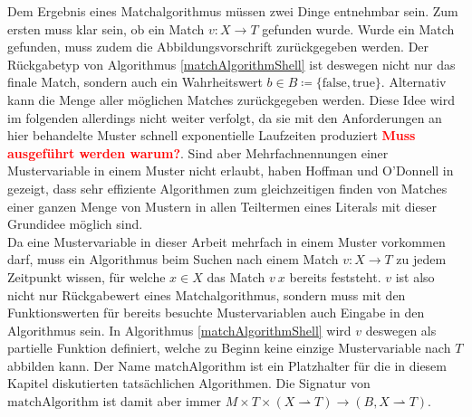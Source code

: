 \documentclass{scrartcl}
\numberwithin{figure}{section} %
\theoremstyle{definition} %
\newcommand{\BFred}[1]{\textbf{\textcolor{red}{#1}}}
\begin{document}
Dem Ergebnis eines Matchalgorithmus müssen zwei Dinge entnehmbar sein. Zum ersten muss klar sein, ob ein Match $v \colon X \rightarrow T$ gefunden wurde. Wurde ein Match gefunden, muss zudem die Abbildungsvorschrift zurückgegeben werden. Der Rückgabetyp von Algorithmus \ref{matchAlgorithmShell} ist deswegen nicht nur das finale Match, sondern auch ein Wahrheitswert $b \in B \coloneqq \{\mathrm{false}, \mathrm{true}\}$. Alternativ kann die Menge aller möglichen Matches zurückgegeben werden. Diese Idee wird im folgenden allerdings nicht weiter verfolgt, da sie mit den Anforderungen an hier behandelte Muster schnell exponentielle Laufzeiten produziert \BFred{Muss ausgeführt werden warum?}. Sind aber Mehrfachnennungen einer Mustervariable in einem Muster nicht erlaubt, haben Hoffman und O'Donnell in \cite{patternMatchingInTrees} gezeigt, dass sehr effiziente Algorithmen zum gleichzeitigen finden von Matches einer ganzen Menge von Mustern in allen Teiltermen eines Literals mit dieser Grundidee möglich sind.\\

Da eine Mustervariable in dieser Arbeit mehrfach in einem Muster vorkommen darf, muss ein Algorithmus beim Suchen nach einem Match $v \colon X \rightarrow T$ zu jedem Zeitpunkt wissen, für welche $x \in X$ das Match $v~x$ bereits feststeht. $v$ ist also nicht nur Rückgabewert eines Matchalgorithmus, sondern muss mit den Funktionswerten für bereits besuchte Mustervariablen auch Eingabe in den Algorithmus sein. In Algorithmus \ref{matchAlgorithmShell} wird $v$ deswegen als partielle Funktion definiert, welche zu Beginn keine einzige Mustervariable nach $T$ abbilden kann. Der Name $\mathrm{matchAlgorithm}$ ist ein Platzhalter für die in diesem Kapitel diskutierten tatsächlichen Algorithmen. Die Signatur von $\mathrm{matchAlgorithm}$ ist damit aber immer $M \times T \times (X \rightharpoonup T) \rightarrow (B, X \rightharpoonup T)$. \\

\begin{algorithm}
\DontPrintSemicolon
\caption{$\mathrm{simpleMatchAlgorithm} \colon M \times T \times (X \rightharpoonup T) \rightarrow (B, X \rightharpoonup T)$}\label{simpleMatchAlgorithm}
\end{algorithm}
\end{document}
